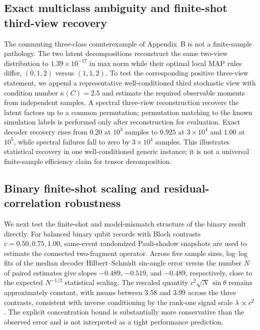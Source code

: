 
\subsection{Exact multiclass ambiguity and finite-shot third-view recovery}

The commuting three-class counterexample of Appendix~B is not a finite-sample
pathology.  The two latent decompositions reconstruct the same two-view
distribution to $1.39\times10^{-17}$ in max norm while their optimal local MAP
rules differ, $(0,1,2)$ versus $(1,1,2)$.  To test the corresponding positive
three-view statement, we append a representative well-conditioned third
stochastic view with condition number $\kappa(C)=2.5$ and estimate the required
observable moments from independent samples.  A spectral three-view
reconstruction recovers the latent factors up to a common permutation;
permutation matching to the known simulation labels is performed only after
reconstruction for evaluation.  Exact decoder recovery rises from $0.20$ at
$10^3$ samples to $0.925$ at $3\times10^4$ and $1.00$ at $10^5$, while spectral
failures fall to zero by $3\times10^4$ samples.  This illustrates statistical
recovery in one well-conditioned generic instance; it is not a universal
finite-sample efficiency claim for tensor decomposition.

\subsection{Binary finite-shot scaling and residual-correlation robustness}

We next test the finite-shot and model-mismatch structure of the binary result
directly.  For balanced binary qubit records with Bloch contrasts
$c=0.50,0.75,1.00$, same-event randomized Pauli-shadow snapshots are used to
estimate the connected two-fragment operator.  Across five sample sizes,
log--log fits of the median decoder Hilbert--Schmidt sin-angle error versus the
number $N$ of paired estimates give slopes $-0.489$, $-0.519$, and $-0.489$,
respectively, close to the expected $N^{-1/2}$ statistical scaling.  The
rescaled quantity $c^2\sqrt{N}\,\sin\theta$ remains approximately constant,
with means between $3.58$ and $3.99$ across the three contrasts, consistent
with inverse conditioning by the rank-one signal scale $\lambda\propto c^2$.
The explicit concentration bound is substantially more conservative than the
observed error and is not interpreted as a tight performance prediction.

